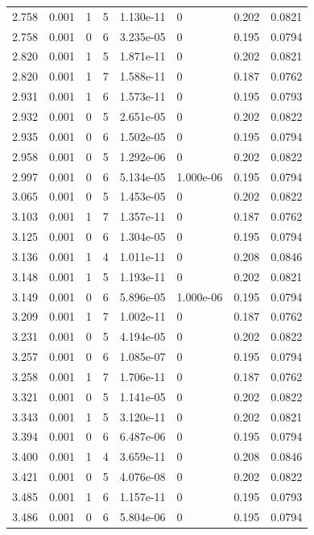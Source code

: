 \documentclass[preview]{standalone}
\begin{document}
{{{\begin{tabular}{L{1.2cm}C{1.2cm} C{0.3cm}C{0.5cm} C{1.4cm}C{1.4cm} C{1.4cm}C{1.4cm}}
  2.758  &  0.001  & 1     &  5 &  1.130e-11  & 0  & 0.202 &  0.0821   \\ 
  2.758  &  0.001  & 0     &  6 &  3.235e-05  & 0  & 0.195 &  0.0794   \\ 
  2.820  &  0.001  & 1     &  5 &  1.871e-11  & 0  & 0.202 &  0.0821   \\ 
  2.820  &  0.001  & 1     &  7 &  1.588e-11  & 0  & 0.187 &  0.0762   \\ 
  2.931  &  0.001  & 1     &  6 &  1.573e-11  & 0  & 0.195 &  0.0793   \\ 
  2.932  &  0.001  & 0     &  5 &  2.651e-05  & 0  & 0.202 &  0.0822   \\ 
  2.935  &  0.001  & 0     &  6 &  1.502e-05  & 0  & 0.195 &  0.0794   \\ 
  2.958  &  0.001  & 0     &  5 &  1.292e-06  & 0  & 0.202 &  0.0822   \\ 
  2.997  &  0.001  & 0     &  6 &  5.134e-05  & 1.000e-06  & 0.195 &  0.0794   \\ 
  3.065  &  0.001  & 0     &  5 &  1.453e-05  & 0  & 0.202 &  0.0822   \\ 
  3.103  &  0.001  & 1     &  7 &  1.357e-11  & 0  & 0.187 &  0.0762   \\ 
  3.125  &  0.001  & 0     &  6 &  1.304e-05  & 0  & 0.195 &  0.0794   \\ 
  3.136  &  0.001  & 1     &  4 &  1.011e-11  & 0  & 0.208 &  0.0846   \\ 
  3.148  &  0.001  & 1     &  5 &  1.193e-11  & 0  & 0.202 &  0.0821   \\ 
  3.149  &  0.001  & 0     &  6 &  5.896e-05  & 1.000e-06  & 0.195 &  0.0794   \\ 
  3.209  &  0.001  & 1     &  7 &  1.002e-11  & 0  & 0.187 &  0.0762   \\ 
  3.231  &  0.001  & 0     &  5 &  4.194e-05  & 0  & 0.202 &  0.0822   \\ 
  3.257  &  0.001  & 0     &  6 &  1.085e-07  & 0  & 0.195 &  0.0794   \\ 
  3.258  &  0.001  & 1     &  7 &  1.706e-11  & 0  & 0.187 &  0.0762   \\ 
  3.321  &  0.001  & 0     &  5 &  1.141e-05  & 0  & 0.202 &  0.0822   \\ 
  3.343  &  0.001  & 1     &  5 &  3.120e-11  & 0  & 0.202 &  0.0821   \\ 
  3.394  &  0.001  & 0     &  6 &  6.487e-06  & 0  & 0.195 &  0.0794   \\ 
  3.400  &  0.001  & 1     &  4 &  3.659e-11  & 0  & 0.208 &  0.0846   \\ 
  3.421  &  0.001  & 0     &  5 &  4.076e-08  & 0  & 0.202 &  0.0822   \\ 
  3.485  &  0.001  & 1     &  6 &  1.157e-11  & 0  & 0.195 &  0.0793   \\ 
  3.486  &  0.001  & 0     &  6 &  5.804e-06  & 0  & 0.195 &  0.0794   \\ 
\hline 
\end{tabular} 

}}}
\end{document}
